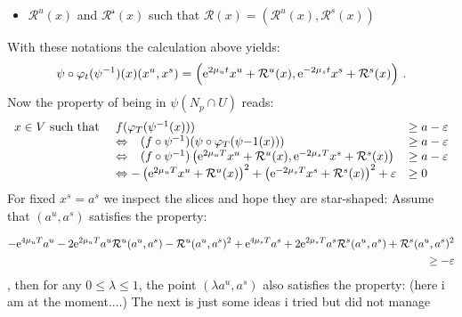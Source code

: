 \begin{remark}
\begin{itemize}
	\item $\mathcal{R}^u(x)$ and $\mathcal{R^s}(x)$ such that $\mathcal{R}(x)=\left(\mathcal{R}^u(x),\mathcal{R}^s(x)\right)$
\end{itemize} With these notations the calculation above yields:
\begin{align*}
	\psi\circ \varphi_t(\psi^{-1})(x)(x^u,x^s)=\left(\mathrm{e}^{2\mu_ut}x^u+\mathcal{R}^u(x),\mathrm{e}^{-2\mu_st}x^s+\mathcal{R}^s(x)\right)\, .
\end{align*}
Now the property of being in $\psi(N_p\cap U)$ reads:
\begin{align*}
	\begin{array}{lll}
		x\in V \text{ such that } & f(\varphi_T (\psi^{-1}(x))) & \geq a-\varepsilon \\
		&\Leftrightarrow \phantom{-} (f\circ \psi^{-1})(\psi\circ \varphi_T (\psi{-1}(x)))& \geq a-\varepsilon \\
		&\Leftrightarrow  \phantom{-}(f\circ \psi^{-1})\left(\mathrm{e}^{2\mu_uT}x^u+\mathcal{R}^u(x),\mathrm{e}^{-2\mu_sT}x^s+\mathcal{R}^s(x)\right)&\geq a-\varepsilon \\
		&\Leftrightarrow -\left(\mathrm{e}^{2\mu_uT}x^u+\mathcal{R}^u(x)\right)^2    
		+\left(\mathrm{e}^{-2\mu_sT}x^s+\mathcal{R}^s(x)\right)^2+\varepsilon &\geq 0
	\end{array}
\end{align*} 
For fixed $x^s=a^s$ we inspect the slices and hope they are star-shaped: Assume that $(a^u,a^s)$ satisfies the property:

\begin{align*}
	-\mathrm{e}^{4\mu_uT}a^u	-2\mathrm{e}^{2\mu_uT}a^u	\mathcal{R}^u(a^u,a^s)	-\mathcal{R}^u(a^u,a^s)^2
	+\mathrm{e}^{4\mu_sT}a^s	+2\mathrm{e}^{2\mu_sT}a^s	\mathcal{R}^s(a^u,a^s)	+\mathcal{R}^s(a^u,a^s)^2 \\
	\geq -\varepsilon
\end{align*}
, then for any $0\leq \lambda \leq 1$, the point $(\lambda a^u,a^s)$ also satisfies the property: (here i am at the moment....)
The next is just some ideas i tried but did not manage


\end{remark}
